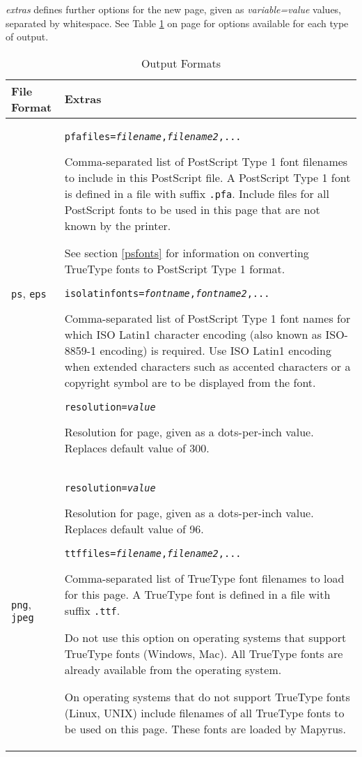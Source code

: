 \textit{extras} defines further options for the new page, given as
\textit{variable=value} values, separated by whitespace.
See Table \ref{outputformats} on page \pageref{outputformats}
for options available for each type of output.

\begin{table}[htb]
\begin{tabular}{|p{3cm}|p{9cm}|}
\hline
File Format & Extras \\
\hline
\hline

\texttt{ps}, \texttt{eps} &
\texttt{pfafiles=\textit{filename},\textit{filename2},...}

Comma-separated list of PostScript Type 1 font filenames
to include in this PostScript file.
A PostScript Type 1 font is defined in a file
with suffix \texttt{.pfa}.  Include
files for all PostScript fonts to be used in this
page that are not known by the printer.

See section \ref{psfonts} for
information on converting TrueType fonts to PostScript Type 1 format.

\vspace{10pt}
\texttt{isolatinfonts=\textit{fontname},\textit{fontname2},...}

Comma-separated list of PostScript Type 1 font names for
which ISO Latin1 character encoding
(also known as ISO-8859-1 encoding)
is required.  Use ISO Latin1 encoding
when extended characters such as accented characters
or a copyright symbol are to be displayed from the font.

\vspace{10pt}
\texttt{resolution=\textit{value}}

Resolution for page, given as a dots-per-inch value.  Replaces
default value of 300. \\

\hline

\texttt{png}, \texttt{jpeg} &

\texttt{resolution=\textit{value}}

Resolution for page, given as a dots-per-inch value.  Replaces
default value of 96.

\vspace{10pt}
\texttt{ttffiles=\textit{filename},\textit{filename2},...}

Comma-separated list of TrueType font filenames
to load for this page.
A TrueType font is defined in a file
with suffix \texttt{.ttf}.

Do not use this option on operating systems that support
TrueType fonts (Windows, Mac).  All TrueType
fonts are already available from the operating system.

On operating systems that do not support TrueType fonts
(Linux, UNIX) include filenames of all TrueType
fonts to be used on this page.  These fonts are loaded
by Mapyrus. \\

\hline

\end{tabular}
\caption{Output Formats}
\label{outputformats}
\end{table}

